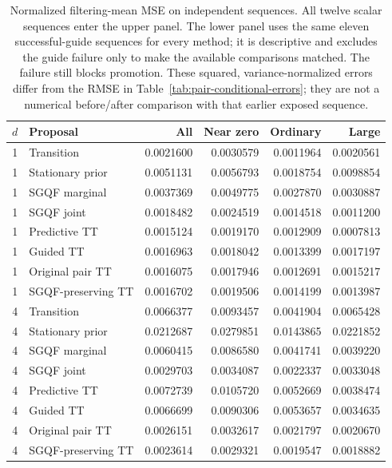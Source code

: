 \documentclass[11pt]{article}
\begin{document}
\begin{table}[htbp]
\centering
\small
\begin{tabular}{clrrrr}
\toprule
$d$ & Proposal & All & Near zero & Ordinary & Large\\
\midrule
1 & Transition & 0.0021600 & 0.0030579 & 0.0011964 & 0.0020561\\
1 & Stationary prior & 0.0051131 & 0.0056793 & 0.0018754 & 0.0098854\\
1 & SGQF marginal & 0.0037369 & 0.0049775 & 0.0027870 & 0.0030887\\
1 & SGQF joint & 0.0018482 & 0.0024519 & 0.0014518 & 0.0011200\\
1 & Predictive TT & 0.0015124 & 0.0019170 & 0.0012909 & 0.0007813\\
1 & Guided TT & 0.0016963 & 0.0018042 & 0.0013399 & 0.0017197\\
1 & Original pair TT & 0.0016075 & 0.0017946 & 0.0012691 & 0.0015217\\
1 & SGQF-preserving TT & 0.0016702 & 0.0019506 & 0.0014199 & 0.0013987\\
\midrule
4 & Transition & 0.0066377 & 0.0093457 & 0.0041904 & 0.0065428\\
4 & Stationary prior & 0.0212687 & 0.0279851 & 0.0143865 & 0.0221852\\
4 & SGQF marginal & 0.0060415 & 0.0086580 & 0.0041741 & 0.0039220\\
4 & SGQF joint & 0.0029703 & 0.0034087 & 0.0022337 & 0.0033048\\
4 & Predictive TT & 0.0072739 & 0.0105720 & 0.0052669 & 0.0038474\\
4 & Guided TT & 0.0066699 & 0.0090306 & 0.0053657 & 0.0034635\\
4 & Original pair TT & 0.0026151 & 0.0032617 & 0.0021797 & 0.0020670\\
4 & SGQF-preserving TT & 0.0023614 & 0.0029321 & 0.0019547 & 0.0018882\\
\bottomrule
\end{tabular}
\caption{Normalized filtering-mean MSE on independent sequences. All twelve scalar sequences enter the upper panel. The lower panel uses the same eleven successful-guide sequences for every method; it is descriptive and excludes the guide failure only to make the available comparisons matched. The failure still blocks promotion. These squared, variance-normalized errors differ from the RMSE in Table~\ref{tab:pair-conditional-errors}; they are not a numerical before/after comparison with that earlier exposed sequence.}
\label{tab:sgqf-independent-mse}
\end{table}
\end{document}
